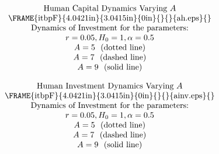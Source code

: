 \documentclass{article}
\numberwithin{equation}{section}
\begin{document}
\pagebreak 
\begin{equation*}
\begin{tabular}{c}
$\text{Human Capital Dynamics Varying }A$ \\ 
\FRAME{itbpF}{4.0421in}{3.0415in}{0in}{}{}{ah.eps}{\special{language
"Scientific Word";type "GRAPHIC";maintain-aspect-ratio TRUE;display
"USEDEF";valid_file "F";width 4.0421in;height 3.0415in;depth
0in;original-width 5.8219in;original-height 4.3708in;cropleft "0";croptop
"1";cropright "1";cropbottom "0";filename 'AH.eps';file-properties "XNPEU";}}
\\ 
$\text{Dynamics of Investment for the parameters:}$ \\ 
$r=0.05,H_{0}=1,\alpha =0.5$ \\ 
$A=5\text{ \ (dotted line)}$ \\ 
$A=7\text{ \ (dashed line)}$ \\ 
$A=9\text{ \ (solid line)}$%
\end{tabular}%
\end{equation*}

\pagebreak

\begin{equation*}
\begin{tabular}{c}
$\text{Human Investment Dynamics Varying }A$ \\ 
\FRAME{itbpF}{4.0421in}{3.0415in}{0in}{}{}{ainv.eps}{\special{language
"Scientific Word";type "GRAPHIC";maintain-aspect-ratio TRUE;display
"USEDEF";valid_file "F";width 4.0421in;height 3.0415in;depth
0in;original-width 5.8219in;original-height 4.3708in;cropleft "0";croptop
"1";cropright "1";cropbottom "0";filename 'AInv.eps';file-properties
"XNPEU";}} \\ 
$\text{Dynamics of Investment for the parameters:}$ \\ 
$r=0.05,H_{0}=1,\alpha =0.5$ \\ 
$A=5\text{ \ (dotted line)}$ \\ 
$A=7\text{ \ (dashed line)}$ \\ 
$A=9\text{ \ (solid line)}$%
\end{tabular}%
\end{equation*}

\pagebreak
\end{document}
